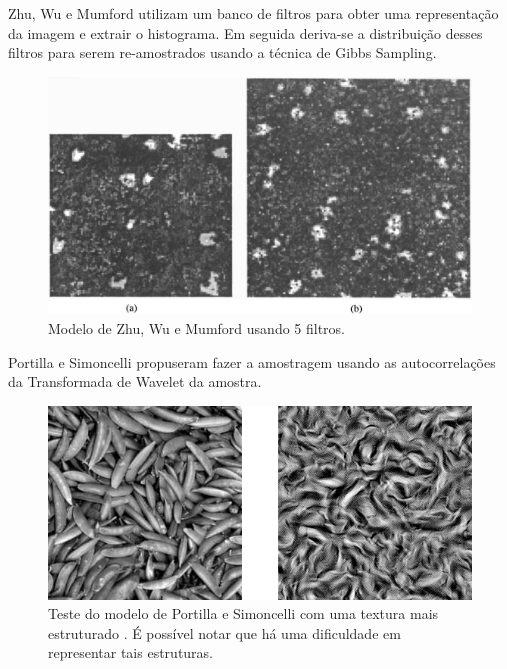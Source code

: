 Zhu, Wu e Mumford \cite{Zhu1998}
utilizam um banco de filtros para
obter uma representação da imagem
e extrair o histograma.
Em seguida deriva-se a distribuição
desses filtros para serem re-amostrados
usando a técnica de Gibbs Sampling.

\begin{figure}[!ht]
	\centering
	\includegraphics[width=\linewidth*2/3]{files/assets/articles/zhu.png}
	\caption{Modelo de Zhu, Wu e Mumford \cite{Zhu1998} usando 5 filtros.}
	\label{img:preview}
\end{figure}



Portilla e Simoncelli \cite{Portilla1999}
propuseram fazer a amostragem usando
as autocorrelações da Transformada
de Wavelet da amostra.

\begin{figure}[!ht]
	\centering
	\includegraphics[width=\linewidth*2/3]{files/assets/articles/portilla.png}
	\caption{Teste do modelo de Portilla e Simoncelli com uma
	textura mais estruturado \cite{Portilla1999}. 
	É possível notar que há uma
	dificuldade em representar tais estruturas.}
	\label{img:preview}
\end{figure}



